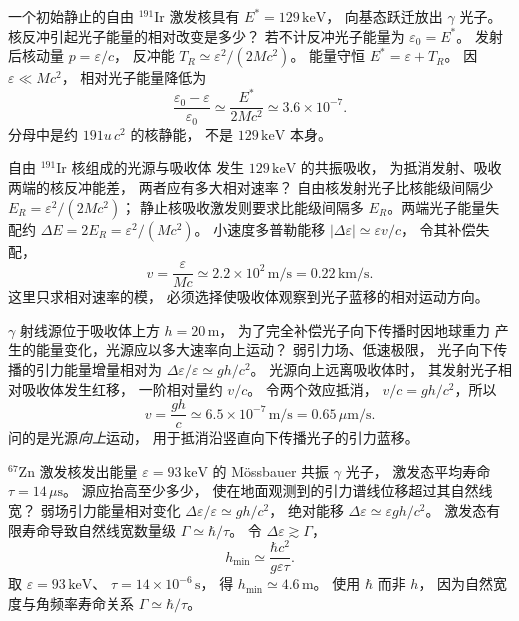 一个初始静止的自由
$\mathrm{^{191}Ir}$ 激发核具有
$E^*=129\,\mathrm{keV}$，
向基态跃迁放出 $\gamma$ 光子。
核反冲引起光子能量的相对改变是多少？
\exsolution
若不计反冲光子能量为 $\varepsilon_0=E^*$。
发射后核动量 $p=\varepsilon/c$，
反冲能
$T_R\simeq\varepsilon^2/(2Mc^2)$。
能量守恒
$E^*=\varepsilon+T_R$。
因 $\varepsilon\ll Mc^2$，
相对光子能量降低为
\[
 \boxed{\frac{\varepsilon_0-\varepsilon}{\varepsilon_0}
 \simeq\frac{E^*}{2Mc^2}
 \simeq3.6\times10^{-7}}.
\]
\excheck 分母中是约 $191u\,c^2$ 的核静能，
不是 $129\,\mathrm{keV}$ 本身。

自由 $\mathrm{^{191}Ir}$ 核组成的光源与吸收体
发生 $129\,\mathrm{keV}$ 的共振吸收，
为抵消发射、吸收两端的核反冲能差，
两者应有多大相对速率？
\exsolution
自由核发射光子比核能级间隔少
$E_R=\varepsilon^2/(2Mc^2)$；
静止核吸收激发则要求比能级间隔多
$E_R$。两端光子能量失配约
$\Delta E=2E_R=\varepsilon^2/(Mc^2)$。
小速度多普勒能移
$|\Delta\varepsilon|\simeq\varepsilon v/c$，
令其补偿失配，
\[
 \boxed{v=\frac{\varepsilon}{Mc}
 \simeq2.2\times10^2\,\mathrm{m/s}
 =0.22\,\mathrm{km/s}}.
\]
\excheck 这里只求相对速率的模，
必须选择使吸收体观察到光子蓝移的相对运动方向。

$\gamma$ 射线源位于吸收体上方
$h=20\,\mathrm m$，
为了完全补偿光子向下传播时因地球重力
产生的能量变化，光源应以多大速率向上运动？
\exsolution
弱引力场、低速极限，
光子向下传播的引力能量增量相对为
$\Delta\varepsilon/\varepsilon\simeq gh/c^2$。
光源向上远离吸收体时，
其发射光子相对吸收体发生红移，
一阶相对量约 $v/c$。
令两个效应抵消，
$v/c=gh/c^2$，所以
\[
 \boxed{v=\frac{gh}{c}\simeq
 6.5\times10^{-7}\,\mathrm{m/s}
 =0.65\,\mu\mathrm{m/s}}.
\]
\excheck 问的是光源\emph{向上}运动，
用于抵消沿竖直向下传播光子的引力蓝移。

$\mathrm{^{67}Zn}$ 激发核发出能量
$\varepsilon=93\,\mathrm{keV}$ 的
Mössbauer 共振 $\gamma$ 光子，
激发态平均寿命 $\tau=14\,\mu\mathrm s$。
源应抬高至少多少，
使在地面观测到的引力谱线位移超过其自然线宽？
\exsolution
弱场引力能量相对变化
$\Delta\varepsilon/\varepsilon\simeq gh/c^2$，
绝对能移
$\Delta\varepsilon\simeq\varepsilon gh/c^2$。
激发态有限寿命导致自然线宽数量级
$\Gamma\simeq\hbar/\tau$。
令 $\Delta\varepsilon\gtrsim\Gamma$，
\[
 \boxed{h_{\min}\simeq
 \frac{\hbar c^2}{g\varepsilon\tau}}.
\]
取 $\varepsilon=93\,\mathrm{keV}$、
$\tau=14\times10^{-6}\,\mathrm s$，
得
$\boxed{h_{\min}\simeq4.6\,\mathrm m}$。
\excheck 使用 $\hbar$ 而非 $h$，
因为自然宽度与角频率寿命关系
$\Gamma\simeq\hbar/\tau$。
